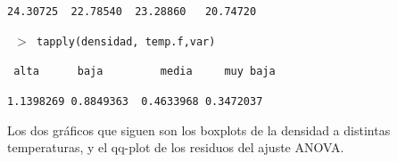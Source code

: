 \documentclass[11pt,a4paper,twoside]{article}%
\begin{document}
\texttt{24.30725 \ 22.78540 \ 23.28860 \ \ 20.74720 }

\texttt{%
$>$
tapply(densidad, temp.f,var)}

\texttt{ alta \ \ \ \ \ baja \ \ \ \ \ \ \ \ media \ \ \ \ muy baja }

\texttt{1.1398269 0.8849363 \ 0.4633968 0.3472037 }\newline

Los dos
gr\'{a}ficos que siguen son los boxplots de la densidad a distintas
temperaturas, y el qq-plot de los residuos del ajuste ANOVA.
\end{document}
